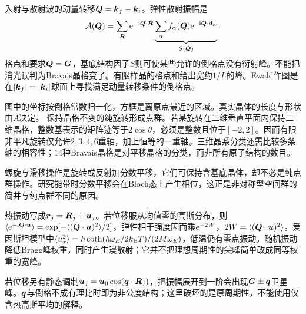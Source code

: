 入射与散射波的动量转移$\boldsymbol{Q}=\boldsymbol{k}_f-\boldsymbol{k}_i$。弹性散射振幅是
\begin{equation}
\mathcal A(\boldsymbol{Q})=\sum_{\boldsymbol{R}}\mathrm e^{-\mathrm i\boldsymbol{Q}\cdot\boldsymbol{R}}\underbrace{\sum_\alpha f_\alpha(\boldsymbol{Q})\mathrm e^{-\mathrm i\boldsymbol{Q}\cdot\boldsymbol{d}_\alpha}}_{S(\boldsymbol{Q})}.
\end{equation}
格点和要求$\boldsymbol{Q}=\boldsymbol{G}$，基底结构因子$S$则可使某些允许的倒格点没有衍射峰。不能把消光误判为Bravais晶格变了。有限样品的格点和给出宽约$1/L$的峰。Ewald作图是在$|\boldsymbol{k}_f|=|\boldsymbol{k}_i|$球面上寻找满足动量转移条件的倒格点。

\begin{center}
\end{center}
图中的坐标按倒格常数归一化，方框是离原点最近的区域。真实晶体的长度与形状由$A$决定。
保持晶格不变的纯旋转形成点群。若某旋转在二维垂直平面内保持二维晶格，整数基表示的矩阵迹等于$2\cos\theta$，必须是整数且位于$[-2,2]$。因而有限非平凡旋转仅允许$2,3,4,6$重轴，加上恒等的一重轴。三维晶系分类还需比较多条轴的相容性；14种Bravais晶格是对平移晶格的分类，而非所有原子结构的数目。

螺旋与滑移操作是旋转或反射加分数平移，它们可保持含基底晶体，却不必是纯点群操作。研究能带时分数平移会在Bloch态上产生相位，这正是非对称型空间群的简并与纯点群不同的原因。

热振动写成$\boldsymbol{r}_j=\boldsymbol{R}_j+\boldsymbol{u}_j$。若位移服从均值零的高斯分布，则$\langle \mathrm e^{-\mathrm i\boldsymbol{Q}\cdot\boldsymbol{u}}\rangle=\exp[-\langle (\boldsymbol{Q}\cdot\boldsymbol{u})^2\rangle/2]$。弹性相干强度因而乘$\mathrm e^{-2W}$，$2W=\langle (\boldsymbol{Q}\cdot\boldsymbol{u})^2\rangle$。爱因斯坦模型中$\langle u_x^2\rangle=\hbar\coth(\hbar\omega_E/2k_{\mathrm B} T)/(2M\omega_E)$，低温仍有零点振动。随机振动降低Bragg峰权重，同时产生漫散射；它并不把理想周期性的尖峰简单改成同等权重的宽峰。

若位移另有静态调制$\boldsymbol{u}_j=\boldsymbol{u}_0\cos(\boldsymbol{q}\cdot\boldsymbol{R}_j)$，把振幅展开到一阶会出现$\boldsymbol{G}\pm\boldsymbol{q}$卫星峰。$\boldsymbol{q}$与倒格不成有理比时即为非公度结构；这里破坏的是原周期性，不能使用仅含热高斯平均的解释。
